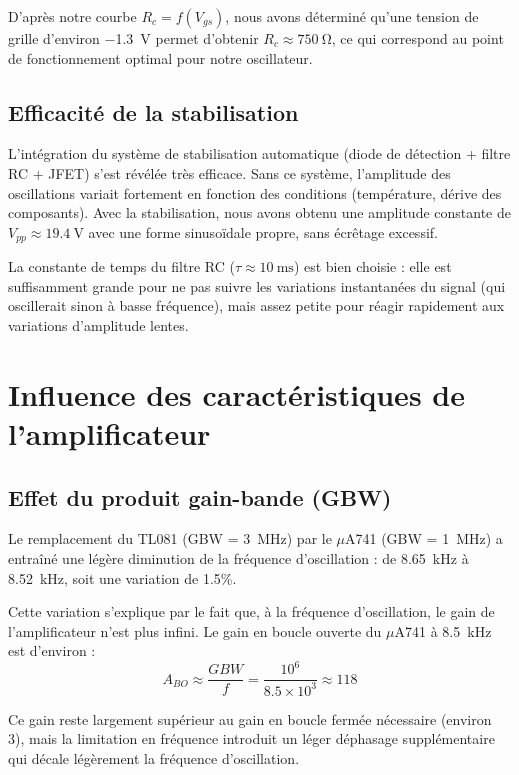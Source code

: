 \documentclass[11pt,a4paper]{report}
\begin{document}
D'après notre courbe \(R_{c} = f(V_{gs})\), nous avons déterminé qu'une tension de grille d'environ \SI{-1.3}{\volt} permet d'obtenir \(R_{c} \approx \SI{750}{\ohm}\), ce qui correspond au point de fonctionnement optimal pour notre oscillateur.

\subsection{Efficacité de la stabilisation}

L'intégration du système de stabilisation automatique (diode de détection + filtre RC + JFET) s'est révélée très efficace. Sans ce système, l'amplitude des oscillations variait fortement en fonction des conditions (température, dérive des composants). Avec la stabilisation, nous avons obtenu une amplitude constante de \(V_{pp} \approx \SI{19.4}{\volt}\) avec une forme sinusoïdale propre, sans écrêtage excessif.

La constante de temps du filtre RC (\(\tau \approx \SI{10}{\milli\second}\)) est bien choisie : elle est suffisamment grande pour ne pas suivre les variations instantanées du signal (qui oscillerait sinon à basse fréquence), mais assez petite pour réagir rapidement aux variations d'amplitude lentes.

\section{Influence des caractéristiques de l'amplificateur}

\subsection{Effet du produit gain-bande (GBW)}

Le remplacement du TL081 (GBW = \SI{3}{\mega\hertz}) par le \(\mu\)A741 (GBW = \SI{1}{\mega\hertz}) a entraîné une légère diminution de la fréquence d'oscillation : de \SI{8.65}{\kilo\hertz} à \SI{8.52}{\kilo\hertz}, soit une variation de 1.5\%.

Cette variation s'explique par le fait que, à la fréquence d'oscillation, le gain de l'amplificateur n'est plus infini. Le gain en boucle ouverte du \(\mu\)A741 à \SI{8.5}{\kilo\hertz} est d'environ :
\[
A_{BO} \approx \frac{GBW}{f} = \frac{10^6}{8.5 \times 10^3} \approx 118
\]

Ce gain reste largement supérieur au gain en boucle fermée nécessaire (environ 3), mais la limitation en fréquence introduit un léger déphasage supplémentaire qui décale légèrement la fréquence d'oscillation.
\end{document}

